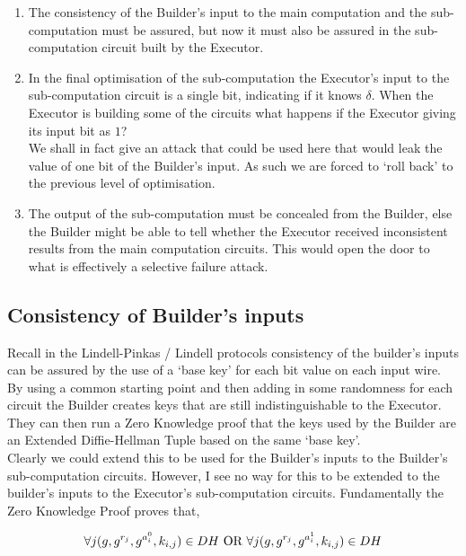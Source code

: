 \documentclass[ %
                    author={Nicholas Tutte},
                supervisor={Prof. Nigel Smart},
                    degree={MEng},
                     title={Secure Two Party Computation},
                  subtitle={A practical comparison of recent protocols},
                      type={Research - GG1K},
                      year={2015} ]{dissertation}
\begin{document}
				\begin{enumerate}
					\item The consistency of the Builder's input to the main computation and the sub-computation must be assured, but now it must also be assured in the sub-computation circuit built by the Executor.

					\item In the final optimisation of the sub-computation the Executor's input to the sub-computation circuit is a single bit, indicating if it knows $\delta$. When the Executor is building some of the circuits what happens if the Executor giving its input bit as $1$?\\

					We shall in fact give an attack that could be used here that would leak the value of one bit of the Builder's input. As such we are forced to `roll back' to the previous level of optimisation.

					\item The output of the sub-computation must be concealed from the Builder, else the Builder might be able to tell whether the Executor received inconsistent results from the main computation circuits. This would open the door to what is effectively a selective failure attack.\\

				\end{enumerate}


			\subsection{Consistency of Builder's inputs}
				Recall in the Lindell-Pinkas / Lindell protocols consistency of the builder's inputs can be assured by the use of a `base key' for each bit value on each input wire. By using a common starting point and then adding in some randomness for each circuit the Builder creates keys that are still indistinguishable to the Executor. They can then run a Zero Knowledge proof that the keys used by the Builder are an Extended Diffie-Hellman Tuple based on the same `base key'.\\

				Clearly we could extend this to be used for the Builder's inputs to the Builder's sub-computation circuits. However, I see no way for this to be extended to the builder's inputs to the Executor's sub-computation circuits. Fundamentally the Zero Knowledge Proof proves that,
				
				$$\forall j (g, g^{r_j}, g^{a_i^0}, k_{i,j}) \in DH \textnormal{ OR } \forall j (g, g^{r_j}, g^{a_i^1}, k_{i,j}) \in DH$$
				
\end{document}
